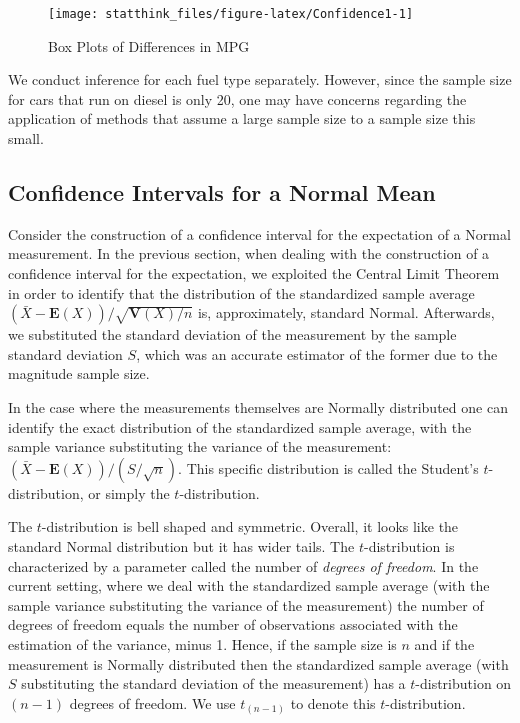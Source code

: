 \documentclass[]{krantz}
\newcommand{\Expec}{\mathbf{E}}
\newcommand{\Var}{\mathbf{V}}
\theoremstyle{definition}
\theoremstyle{definition}
\theoremstyle{definition}
\theoremstyle{remark}
\begin{document}
\begin{figure}

{\centering \texttt{[image: statthink\_files/figure-latex/Confidence1-1]} 

}

\caption{Box Plots of Differences in MPG}\label{fig:Confidence1}
\end{figure}

We conduct inference for each fuel type separately. However, since the
sample size for cars that run on diesel is only 20, one may have
concerns regarding the application of methods that assume a large sample
size to a sample size this small.

\hypertarget{confidence-intervals-for-a-normal-mean}{%
\subsection{Confidence Intervals for a Normal Mean}\label{confidence-intervals-for-a-normal-mean}}

Consider the construction of a confidence interval for the expectation
of a Normal measurement. In the previous section, when dealing with the
construction of a confidence interval for the expectation, we exploited
the Central Limit Theorem in order to identify that the distribution of
the standardized sample average \((\bar X - \Expec(X))/\sqrt{\Var(X)/n}\)
is, approximately, standard Normal. Afterwards, we substituted the
standard deviation of the measurement by the sample standard deviation
\(S\), which was an accurate estimator of the former due to the magnitude
sample size.

In the case where the measurements themselves are Normally distributed
one can identify the exact distribution of the standardized sample
average, with the sample variance substituting the variance of the
measurement: \((\bar X - \Expec(X))/(S/\sqrt{n})\). This specific
distribution is called the Student's \(t\)-distribution, or simply the
\(t\)-distribution.

The \(t\)-distribution is bell shaped and symmetric. Overall, it looks
like the standard Normal distribution but it has wider tails. The
\(t\)-distribution is characterized by a parameter called the number of
\emph{degrees of freedom}. In the current setting, where we deal with the
standardized sample average (with the sample variance substituting the
variance of the measurement) the number of degrees of freedom equals the
number of observations associated with the estimation of the variance,
minus 1. Hence, if the sample size is \(n\) and if the measurement is
Normally distributed then the standardized sample average (with \(S\)
substituting the standard deviation of the measurement) has a
\(t\)-distribution on \((n-1)\) degrees of freedom. We use \(t_{(n-1)}\) to
denote this \(t\)-distribution.
\end{document}
